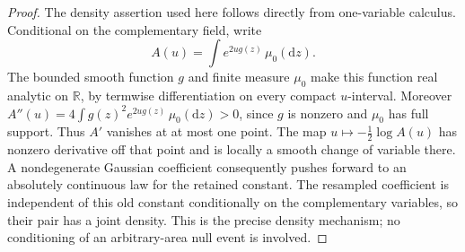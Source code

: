\begin{proof}
The density assertion used here follows directly from one-variable calculus. Conditional on the
complementary field, write
\[
 A(u)=\int e^{2u g(z)}\,\mu_0(\mathrm dz).
\]
The bounded smooth function \(g\) and finite measure \(\mu_0\) make this function real analytic
on \(\mathbb R\), by termwise differentiation on every compact \(u\)-interval. Moreover
\(A''(u)=4\int g(z)^2e^{2u g(z)}\,\mu_0(\mathrm dz)>0\), since \(g\) is nonzero and
\(\mu_0\) has full support. Thus \(A'\) vanishes at at most one point. The map
\(u\mapsto-\frac12\log A(u)\) has nonzero derivative off that point and is locally a smooth
change of variable there. A nondegenerate Gaussian coefficient consequently pushes forward
to an absolutely continuous law for the retained constant. The resampled coefficient is
independent of this old constant conditionally on the complementary variables, so their pair
has a joint density. This is the precise density mechanism; no conditioning of an
arbitrary-area null event is involved.

\end{proof}
